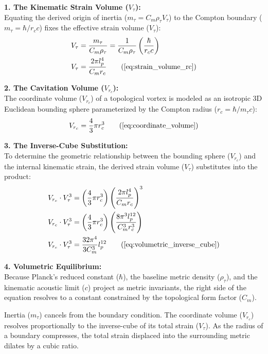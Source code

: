 \vspace{0.2 cm}

\textbf{1. The Kinematic Strain Volume ($V_\tau$):} \\ 
Equating the derived origin of inertia ($m_\tau = C_m \rho_{\tau} V_\tau$) to the Compton boundary ($m_\tau = \hbar / r_c c$) fixes the effective strain volume ($V_\tau$): 
\begin{align}
    V_\tau &= \frac{m_\tau}{C_m\rho_\tau} = \frac{1}{C_m\rho_\tau} \left( \frac{\hbar}{r_c c} \right) \nonumber \\
    V_\tau &= \frac{2\pi l_p^4}{C_m r_c} \tag{\ref{eq:strain_volume_rc}}
\end{align}

\textbf{2. The Cavitation Volume ($V_{r_c}$):} \\
The coordinate volume ($V_{r_c}$) of a topological vortex is modeled as an isotropic 3D Euclidean bounding sphere parameterized by the Compton radius ($r_c = \hbar/m_\tau c$): 
\begin{equation}
    V_{r_c} = \frac{4}{3}\pi r_c^3 \tag{\ref{eq:coordinate_volume}}
\end{equation}

\textbf{3. The Inverse-Cube Substitution:} \\
To determine the geometric relationship between the bounding sphere ($V_{r_c}$) and the internal kinematic strain, the derived strain volume ($V_\tau$) substitutes into the product:
\begin{align}
    V_{r_c} \cdot V_\tau^3 &= \left( \frac{4}{3}\pi r_c^3 \right) \left( \frac{2\pi l_p^4}{C_m r_c} \right)^3 \nonumber \\
    V_{r_c} \cdot V_\tau^3 &= \left( \frac{4}{3}\pi r_c^3 \right) \left( \frac{8\pi^3 l_p^{12}}{C_m^3 r_c^3} \right) \nonumber \\
    V_{r_c} \cdot V_\tau^3 &= \frac{32\pi^4}{3C_m^3} l_p^{12} \tag{\ref{eq:volumetric_inverse_cube}} 
\end{align}

\textbf{4. Volumetric Equilibrium:} \\
Because Planck's reduced constant ($\hbar$), the baseline metric density ($\rho_{\tau}$), and the kinematic acoustic limit ($c$) project as metric invariants, the right side of the equation resolves to a constant constrained by the topological form factor ($C_m$). 

Inertia ($m_\tau$) cancels from the boundary condition. The coordinate volume ($V_{r_c}$) resolves proportionally to the inverse-cube of its total strain ($V_\tau$). As the radius of a boundary compresses, the total strain displaced into the surrounding metric dilates by a cubic ratio. 

